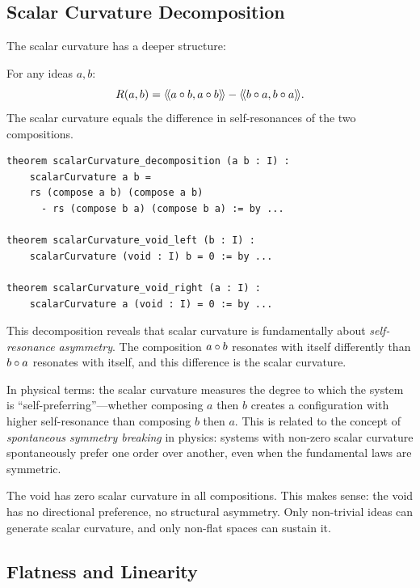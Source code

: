 \subsection{Scalar Curvature Decomposition}

The scalar curvature has a deeper structure:

\begin{theorem}
\label{thm:scalar-curvature-decomposition}
For any ideas $a, b$:
\[
  R(a, b) = \langle\!\langle a \circ b, a \circ b \rangle\!\rangle - \langle\!\langle b \circ a, b \circ a \rangle\!\rangle.
\]
The scalar curvature equals the difference in self-resonances of the two
compositions.
\end{theorem}

\begin{lstlisting}[caption={Scalar curvature decomposition (IDT\_v3\_Emergence.lean)}]
theorem scalarCurvature_decomposition (a b : I) :
    scalarCurvature a b =
    rs (compose a b) (compose a b)
      - rs (compose b a) (compose b a) := by ...
      
theorem scalarCurvature_void_left (b : I) :
    scalarCurvature (void : I) b = 0 := by ...
    
theorem scalarCurvature_void_right (a : I) :
    scalarCurvature a (void : I) = 0 := by ...
\end{lstlisting}

\begin{interpretation}
This decomposition reveals that scalar curvature is fundamentally about
\emph{self-resonance asymmetry}. The composition $a \circ b$ resonates with
itself differently than $b \circ a$ resonates with itself, and this difference
is the scalar curvature.

In physical terms: the scalar curvature measures the degree to which the system
is ``self-preferring''---whether composing $a$ then $b$ creates a configuration
with higher self-resonance than composing $b$ then $a$. This is related to the
concept of \emph{spontaneous symmetry breaking} in physics: systems with
non-zero scalar curvature spontaneously prefer one order over another, even when
the fundamental laws are symmetric.

The void has zero scalar curvature in all compositions. This makes sense: the
void has no directional preference, no structural asymmetry. Only non-trivial
ideas can generate scalar curvature, and only non-flat spaces can sustain it.
\end{interpretation}

\subsection{Flatness and Linearity}

